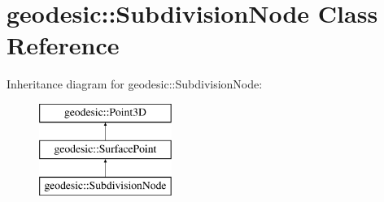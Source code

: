 \hypertarget{classgeodesic_1_1_subdivision_node}{}\section{geodesic\+:\+:Subdivision\+Node Class Reference}
\label{classgeodesic_1_1_subdivision_node}
Inheritance diagram for geodesic\+:\+:Subdivision\+Node\+:\begin{figure}[H]
\begin{center}
\leavevmode
\includegraphics[height=3.000000cm]{classgeodesic_1_1_subdivision_node}
\end{center}
\end{figure}
